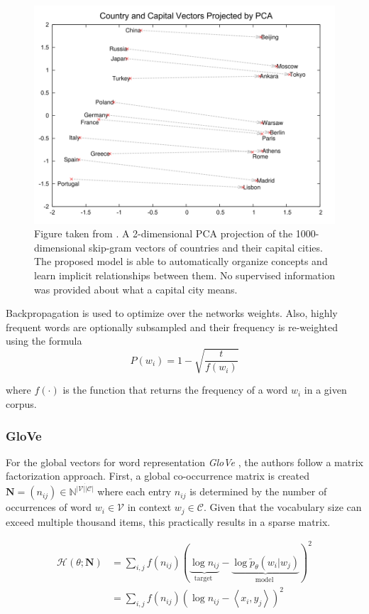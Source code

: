 \documentclass[a4paper,12pt,twoside,openright]{report}
\begin{document}
\begin{figure}[h]
	\center
  \includegraphics[width=0.6\linewidth]{./assets/background/word2vec_cities.png}
  \caption{Figure taken from \cite{mikolov13b}. A 2-dimensional PCA projection of the 1000-dimensional skip-gram vectors of countries and their capital cities. The proposed model is able to automatically organize concepts and learn implicit relationships between them. No supervised information was provided about what a capital city means.}
  \label{fig:cbow_skipgram}
\end{figure}

Backpropagation is used to optimize over the networks weights. 
Also, highly frequent words are optionally subsampled and their frequency is re-weighted using the formula $$
P\left(w_{i}\right)=1-\sqrt{\frac{t}{f\left(w_{i}\right)}}
$$

where $f( \cdot )$ is the function that returns the frequency of a word $w_i$ in a given corpus.

\subsubsection{GloVe}

For the global vectors for word representation \textit{GloVe} \cite{pennington14}, the authors follow a matrix factorization approach.
First, a global co-occurrence matrix is created $\mathbf{N} = (n_{ij}) \in \mathbb{N}^{|\mathcal{V}| \dot |\mathcal{C}|}$ where each entry $n_{ij}$ is determined by the number of occurrences of word $w_i \in \mathcal{V}$ in context $w_j \in \mathcal{C}$.
Given that the vocabulary size can exceed multiple thousand items, this practically results in a sparse matrix.

\begin{align}
\mathcal{H}(\theta ; \mathbf{N}) &=
\sum_{i, j} f\left(n_{i j}\right)(\underbrace{\log n_{i j}}_{\text {target }}-\underbrace{\log \tilde{p}_{\theta}\left(w_{i} | w_{j}\right)}_{\text {model }})^{2} \\
&= \sum_{i, j} f\left(n_{i j}\right)(\log n_{i j} - \left\langle x_i, y_j \right\rangle )^{2} \\
\end{align}
\end{document}
